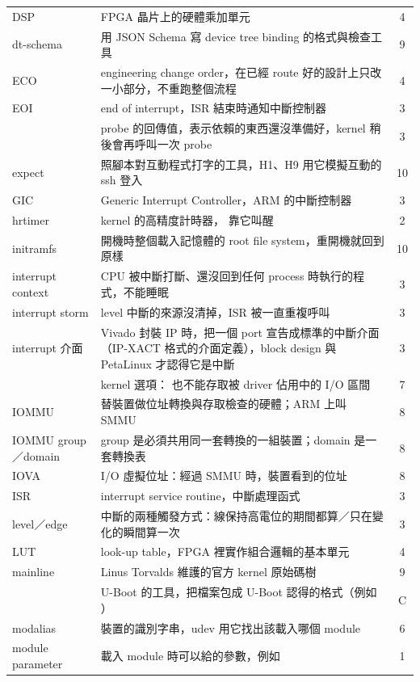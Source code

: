 \begin{xltabular}{\textwidth}{l X c}
DSP & FPGA 晶片上的硬體乘加單元 & 4 \\
dt-schema & 用 JSON Schema 寫 device tree binding 的格式與檢查工具 & 9 \\
ECO & engineering change order，在已經 route 好的設計上只改一小部分，不重跑整個流程 & 4 \\
EOI & end of interrupt，ISR 結束時通知中斷控制器 & 3 \\
 & probe 的回傳值，表示依賴的東西還沒準備好，kernel 稍後會再呼叫一次 probe & 3 \\
expect & 照腳本對互動程式打字的工具，H1、H9 用它模擬互動的 ssh 登入 & 10 \\
GIC & Generic Interrupt Controller，ARM 的中斷控制器 & 3 \\
hrtimer & kernel 的高精度計時器， 靠它叫醒 & 2 \\
initramfs & 開機時整個載入記憶體的 root file system，重開機就回到原樣 & 10 \\
interrupt context & CPU 被中斷打斷、還沒回到任何 process 時執行的程式，不能睡眠 & 3 \\
interrupt storm & level 中斷的來源沒清掉，ISR 被一直重複呼叫 & 3 \\
interrupt 介面 & Vivado 封裝 IP 時，把一個 port 宣告成標準的中斷介面（IP-XACT 格式的介面定義），block design 與 PetaLinux 才認得它是中斷 & 3 \\
 & kernel 選項： 也不能存取被 driver 佔用中的 I/O 區間 & 7 \\
IOMMU & 替裝置做位址轉換與存取檢查的硬體；ARM 上叫 SMMU & 8 \\
IOMMU group／domain & group 是必須共用同一套轉換的一組裝置；domain 是一套轉換表 & 8 \\
IOVA & I/O 虛擬位址：經過 SMMU 時，裝置看到的位址 & 8 \\
ISR & interrupt service routine，中斷處理函式 & 3 \\
level／edge & 中斷的兩種觸發方式：線保持高電位的期間都算／只在變化的瞬間算一次 & 3 \\
LUT & look-up table，FPGA 裡實作組合邏輯的基本單元 & 4 \\
mainline & Linus Torvalds 維護的官方 kernel 原始碼樹 & 9 \\
 & U-Boot 的工具，把檔案包成 U-Boot 認得的格式（例如 ） & C \\
modalias & 裝置的識別字串，udev 用它找出該載入哪個 module & 6 \\
module parameter & 載入 module 時可以給的參數，例如  & 1 \\

\end{xltabular}
